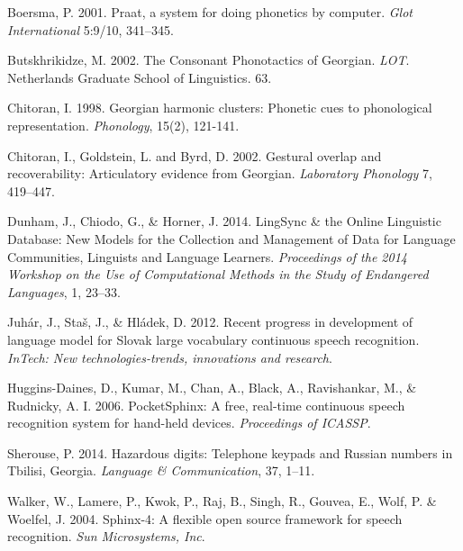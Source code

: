 \documentclass[12pt]{amsart}
\begin{document}
\begin{thebibliography}{17}

  Boersma, P. 2001. Praat, a system for doing phonetics by computer. \emph{Glot International} 5:9/10, 341--345.

  Butskhrikidze, M. 2002. The Consonant Phonotactics of Georgian. \emph{LOT}. Netherlands Graduate School of Linguistics. 63.

  Chitoran, I. 1998. Georgian harmonic clusters: Phonetic cues to phonological representation. \emph{Phonology}, 15(2), 121-141.

  Chitoran, I., Goldstein, L. and Byrd, D. 2002. Gestural overlap and recoverability: Articulatory evidence from Georgian. \emph{Laboratory Phonology} 7, 419--447.

  Dunham, J., Chiodo, G., \& Horner, J. 2014. LingSync \& the Online Linguistic Database: New Models for the Collection and Management of Data for Language Communities, Linguists and Language Learners. \emph{Proceedings of the 2014 Workshop on the Use of Computational Methods in the Study of Endangered Languages}, 1, 23--33.

  Juh{\'a}r, J., Sta{\v{s}}, J., \& Hl{\'a}dek, D. 2012. Recent progress in development of language model for Slovak large vocabulary continuous speech recognition. \emph{InTech: New technologies-trends, innovations and research}.

  Huggins-Daines, D., Kumar, M., Chan, A., Black, A.,  Ravishankar, M., \& Rudnicky,  A. I. 2006. PocketSphinx: A free, real-time continuous speech recognition system for hand-held devices. \emph{Proceedings of ICASSP}.

  Sherouse, P. 2014. Hazardous digits: Telephone keypads and Russian numbers in Tbilisi, Georgia. \emph{Language \& Communication}, 37, 1--11.

  Walker, W., Lamere, P., Kwok, P., Raj, B., Singh, R., Gouvea, E., Wolf, P. \& Woelfel, J. 2004. Sphinx-4: A flexible open source framework for speech recognition. \emph{Sun Microsystems, Inc}.


\end{thebibliography}
\end{document}
